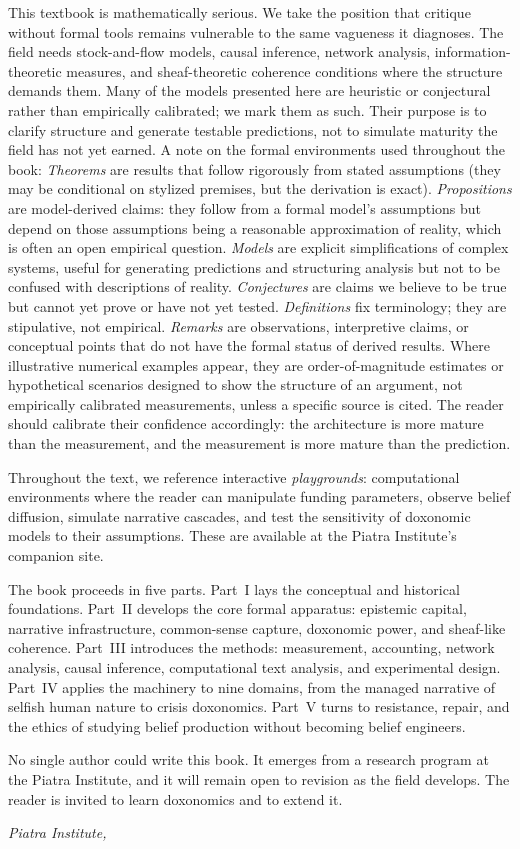 This textbook is mathematically serious.
We take the position that critique without formal tools remains vulnerable to the same vagueness it diagnoses.
The field needs stock-and-flow models, causal inference, network analysis, information-theoretic measures, and sheaf-theoretic coherence conditions where the structure demands them.
Many of the models presented here are heuristic or conjectural rather than empirically calibrated; we mark them as such.
Their purpose is to clarify structure and generate testable predictions, not to simulate maturity the field has not yet earned.
A note on the formal environments used throughout the book:
\emph{Theorems} are results that follow rigorously from stated assumptions (they may be conditional on stylized premises, but the derivation is exact).
\emph{Propositions} are model-derived claims: they follow from a formal model's assumptions but depend on those assumptions being a reasonable approximation of reality, which is often an open empirical question.
\emph{Models} are explicit simplifications of complex systems, useful for generating predictions and structuring analysis but not to be confused with descriptions of reality.
\emph{Conjectures} are claims we believe to be true but cannot yet prove or have not yet tested.
\emph{Definitions} fix terminology; they are stipulative, not empirical.
\emph{Remarks} are observations, interpretive claims, or conceptual points that do not have the formal status of derived results.
Where illustrative numerical examples appear, they are order-of-magnitude estimates or hypothetical scenarios designed to show the structure of an argument, not empirically calibrated measurements, unless a specific source is cited.
The reader should calibrate their confidence accordingly: the architecture is more mature than the measurement, and the measurement is more mature than the prediction.

Throughout the text, we reference interactive \emph{playgrounds}: computational environments where the reader can manipulate funding parameters, observe belief diffusion, simulate narrative cascades, and test the sensitivity of doxonomic models to their assumptions.
These are available at the Piatra Institute's companion site.

The book proceeds in five parts.
Part~I lays the conceptual and historical foundations.
Part~II develops the core formal apparatus: epistemic capital, narrative infrastructure, common-sense capture, doxonomic power, and sheaf-like coherence.
Part~III introduces the methods: measurement, accounting, network analysis, causal inference, computational text analysis, and experimental design.
Part~IV applies the machinery to nine domains, from the managed narrative of selfish human nature to crisis doxonomics.
Part~V turns to resistance, repair, and the ethics of studying belief production without becoming belief engineers.

No single author could write this book.
It emerges from a research program at the Piatra Institute, and it will remain open to revision as the field develops.
The reader is invited to learn doxonomics and to extend it.

\vspace{1em}
\noindent\textit{Piatra Institute, \the\year}

